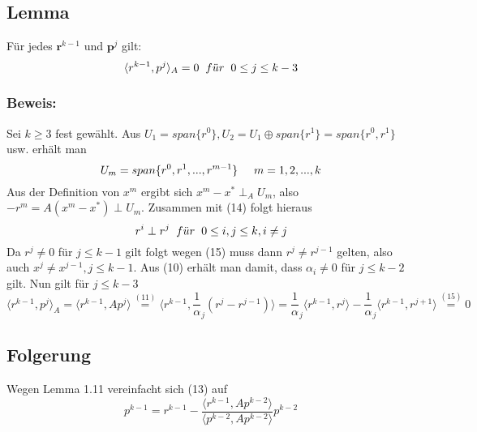 \documentclass{article}
\begin{document}
\subsection{Lemma}
Für jedes $\textbf{r}^{k-1}$ und $\textbf{p}^{j}$ gilt:
\begin{equation*}
\langle r^{k-1}, p^{j} \rangle _{A} = 0 \hspace{2mm} f\ddot{u}r \hspace{2mm} 0 \le j \le k-3
\end{equation*}

\subsubsection{Beweis:}
Sei $k \ge 3$ fest gewählt. Aus $U_{1} = span\{r^{0}\}, U_{2} = U_{1} \oplus span\{r^{1}\} = span\{r^{0}, r^{1}\}$ usw. erhält man
\begin{equation}
U_{m} = span\{r^{0}, r^{1},...,r^{m-1}\} \hspace{5mm} m = 1,2,...,k
\end{equation}
Aus der Definition von $x^{m}$ ergibt sich $x^{m} - x^{*} \perp_{A} U_{m}$, also $-r^{m} = A(x^{m} - x^{*}) \perp U_{m}$. Zusammen mit (14) folgt hieraus
\begin{equation}
r^{i} \perp r^{j} \hspace{2mm} f\ddot{u}r \hspace{2mm} 0 \le i,j \le k, i \ne j
\end{equation}
Da $r^{j} \ne 0$ für $j \le k-1$ gilt folgt wegen (15) muss dann $r^{j} \ne r^{j-1}$ gelten, also auch $x^{j} \ne x^{j-1}, j \le k-1$. Aus (10) erhält man damit,
dass $\alpha_{i} \ne 0$ für $j \le k-2$ gilt. Nun gilt für $j \le k-3$
\begin{equation*}
\langle r^{k-1}, p^{j} \rangle _{A} =
\langle r^{k-1}, Ap^{j} \rangle \overset{(11)}{=} \langle r^{k-1}, {\frac 1 \alpha_{j} (r^{j} - r^{j-1})} \rangle =
\frac 1 \alpha_{j} \langle r^{k-1}, r^{j} \rangle - \frac 1 \alpha_{j} \langle r^{k-1}, r^{j+1} \rangle \overset{(15)}{=} 0
\end{equation*}

\subsection{Folgerung}
Wegen Lemma 1.11 vereinfacht sich (13) auf
\begin{equation*}
p^{k-1} = r^{k-1} - \frac {\langle r^{k-1}, Ap^{k-2} \rangle} {\langle p^{k-2}, Ap^{k-2} \rangle} p^{k-2}
\end{equation*}
\end{document}
